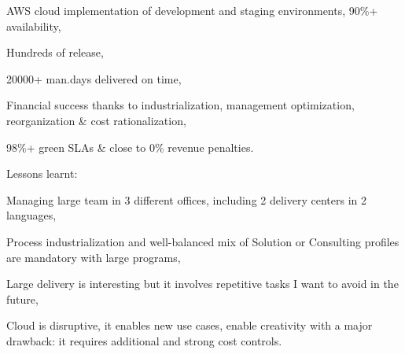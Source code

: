 \begin{cventries}
{\begin{cvitems}
\begin{cvsubitems}
          \item {AWS cloud implementation of development and staging environments, 90\%+ availability,}
          \item {Hundreds of release,}
          \item {20000+ man.days delivered on time,}
          \item {Financial success thanks to industrialization, management optimization, reorganization \& cost rationalization,}
          \item {98\%+ green SLAs \& close to 0\% revenue penalties.}
        \end{cvsubitems}
        \item {Lessons learnt:}
        \begin{cvsubitems}
          \item {Managing large team in 3 different offices, including 2 delivery centers in 2 languages,}
          \item {Process industrialization and well-balanced mix of Solution or Consulting profiles are mandatory with large programs,}
          \item {Large delivery is interesting but it involves repetitive tasks I want to avoid in the future,}
          \item {Cloud is disruptive, it enables new use cases, enable creativity with a major drawback: it requires additional and strong cost controls.}
        \end{cvsubitems}
      \end{cvitems}
    }


\end{cventries}
